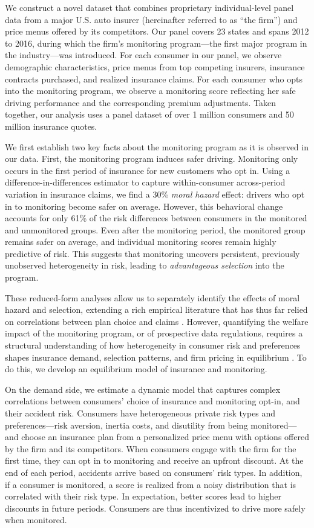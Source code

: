 We construct a novel dataset that combines proprietary individual-level panel data from a major U.S. auto insurer (hereinafter referred to as ``the firm'') and price menus offered by its competitors. Our panel covers 23 states and spans 2012 to 2016, during which the firm's monitoring program---the first major program in the industry---was introduced. For each consumer in our panel, we observe demographic characteristics, price menus from top competing insurers, insurance contracts purchased, and realized insurance claims. For each consumer who opts into the monitoring program, we observe a monitoring score reflecting her safe driving performance and the corresponding premium adjustments. Taken together, our analysis uses a panel dataset of over 1 million consumers and 50 million insurance quotes.

We first establish two key facts about the monitoring program as it is observed in our data. First, the monitoring program induces safer driving. Monitoring only occurs in the first period of insurance for new customers who opt in. Using a difference-in-differences estimator to capture within-consumer across-period variation in insurance claims, we find a 30\% \textit{moral hazard} effect: drivers who opt in to monitoring become safer on average. However, this behavioral change accounts for only 61\% of the risk differences between consumers in the monitored and unmonitored groups. Even after the monitoring period, the monitored group remains safer on average, and individual monitoring scores remain highly predictive of risk. This suggests that monitoring uncovers persistent, previously unobserved heterogeneity in risk, leading to \textit{advantageous selection} into the program.

These reduced-form analyses allow us to separately identify the effects of moral hazard and selection, extending a rich empirical literature that has thus far relied on correlations between plan choice and claims \parencite{Chiappori2000, Cohen2007, jeziorski2019skimming}. However,
quantifying the welfare impact of the monitoring program, or of prospective data regulations, requires a structural understanding of how heterogeneity in consumer risk and preferences shapes insurance demand, selection patterns, and firm pricing in equilibrium \parencite{Einav2010beyond}.
To do this, we develop an equilibrium model of insurance and monitoring.

On the demand side, we estimate a dynamic model that captures complex correlations between consumers' choice of insurance and monitoring opt-in, and their accident risk.
Consumers have heterogeneous private risk types and preferences---risk aversion, inertia costs, and disutility from being monitored---and choose an insurance plan from a personalized price menu with options offered by the firm and its competitors. When consumers engage with the firm for the first time, they can opt in to monitoring and receive an upfront discount. At the end of each period, accidents arrive based on consumers' risk types. In addition, if a consumer is monitored, a score is realized from a noisy distribution that is correlated with their risk type. In expectation, better scores lead to higher discounts in future periods. Consumers are thus incentivized to drive more safely when monitored.

